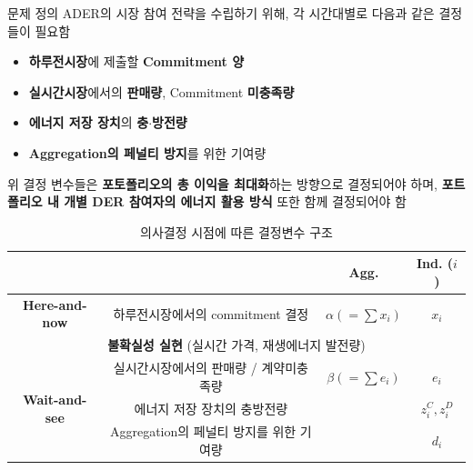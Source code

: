 \documentclass[xcolor=dvipsnames,t,9pt]{beamer}
\begin{document}
\begin{frame}{문제 정의}
    ADER의 시장 참여 전략을 수립하기 위해, 각 시간대별로 다음과 같은 결정들이 필요함
    \begin{itemize}
        \item \textbf{하루전시장}에 제출할 \textbf{Commitment 양}
        \item \textbf{실시간시장}에서의 \textbf{판매량}, Commitment \textbf{미충족량}
        \item \textbf{에너지 저장 장치}의 \textbf{충$\cdot$방전량}
        \item \textbf{Aggregation의 페널티 방지}를 위한 기여량
    \end{itemize}

    \begin{block}{}
        위 결정 변수들은 \textbf{포토폴리오의 총 이익을 최대화}하는 방향으로 결정되어야 하며, \textbf{포트폴리오 내 개별 DER 참여자의 에너지 활용 방식} 또한 함께 결정되어야 함
    \end{block}

    \vspace{-1em}

    \begin{table}[]
        \caption{의사결정 시점에 따른 결정변수 구조}
        \small
        \renewcommand{\arraystretch}{1.3}
        \begin{tabular}{cccc}
            \hline
            \multicolumn{1}{l}{}                                        & \multicolumn{1}{l|}{}                            & Agg.                             & Ind. ($i$)     \\ \hline
            \multicolumn{1}{c|}{\textbf{Here-and-now}}                  & \multicolumn{1}{c|}{하루전시장에서의 commitment 결정}      & $\alpha \left(= \sum x_i\right)$ & $x_i$          \\ \hline
            \multicolumn{4}{c}{\textbf{불확실성 실현} (실시간 가격, 재생에너지 발전량)}                                                                                                           \\ \hline
            \multicolumn{1}{c|}{\multirow{3}{*}{\textbf{Wait-and-see}}} & \multicolumn{1}{c|}{실시간시장에서의 판매량 / 계약미충족량}       & $\beta \left(= \sum e_i \right)$ & $e_i$          \\ \cline{2-4}
            \multicolumn{1}{c|}{}                                       & \multicolumn{1}{c|}{에너지 저장 장치의 충방전량}             &                                  & $z_i^C, z_i^D$
            \\ \cline{2-4}
            \multicolumn{1}{c|}{}                                       & \multicolumn{1}{c|}{Aggregation의 페널티 방지를 위한 기여량} &                                  & $d_i$
            \\ \hline
        \end{tabular}
    \end{table}

\end{frame}
\end{document}
